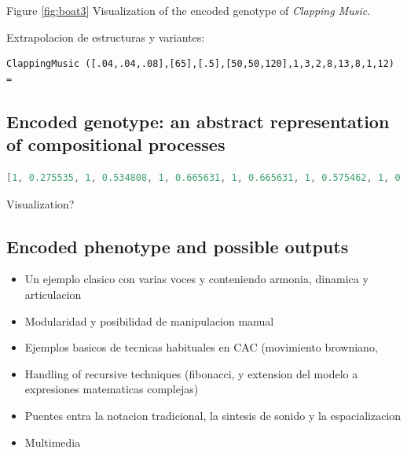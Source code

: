 \documentclass{article}
\begin{document}
Figure \ref{fig:boat3} Visualization of the encoded genotype of \emph{Clapping Music}.



Extrapolacion de estructuras y variantes:

{\small \begin{verbatim}ClappingMusic ([.04,.04,.08],[65],[.5],[50,50,120],1,3,2,8,13,8,1,12) =\end{verbatim}}  


\subsection{Encoded genotype: an abstract representation of compositional processes}

\begin{lstlisting}[language=Java, caption=Encoded genotype for S. Reich's \emph{Clapping Music}]
[1, 0.275535, 1, 0.534808, 1, 0.665631, 1, 0.665631, 1, 0.575462, 1, 0.575462, 1, 0.606798, 1, 0.27051, 0.51, 0.5, 0, 1, 0.506578, 0.53, 0.53, 0, 1, 0.742646, 0.55, 0.51346, 0, 1, 0.36068, 0.56, 0.6, 0.56, 0.6, 0.56, 0.9, 0.56, 0, 0, 0, 1, 0.534808, 1, 0.304952, 0.57, 0, 0, 1, 0.416408, 0.58, 0.55, 0, 0, 0, 1, 0.534808, 1, 0.304952, 0.57, 0.854102, 0, 1, 0.416408, 0.58, 0.6, 0, 0, 0, 1, 0.416408, 0.58, 0.75, 0, 0, 1, 0.416408, 0.58, 0.84, 0, 0, 1, 0.416408, 0.58, 0.75, 0, 0, 1, 0.575462, 1, 0.304952, 0.57, 0.326238, 0, 1, 0.665631, 1, 0.534808, 1, 0.304952, 0.57, 0.18034, 0, 1, 0.416408, 0.58, 0.55, 0, 0, 1, 0.416408, 0.58, 0.82, 0, 0, 0, 0]
\end{lstlisting}

Visualization?

\subsection{Encoded phenotype and possible outputs}



\begin{itemize}

\item Un ejemplo clasico con varias voces y conteniendo armonia, dinamica y articulacion
\item Modularidad y posibilidad de manipulacion manual
\item Ejemplos basicos de tecnicas habituales en CAC (movimiento browniano,
\item Handling of recursive techniques (fibonacci, y extension del modelo a expresiones matematicas complejas)
\item Puentes entra la notacion tradicional, la sintesis de sonido y la espacializacion
\item Multimedia
\end{itemize}
\end{document}
